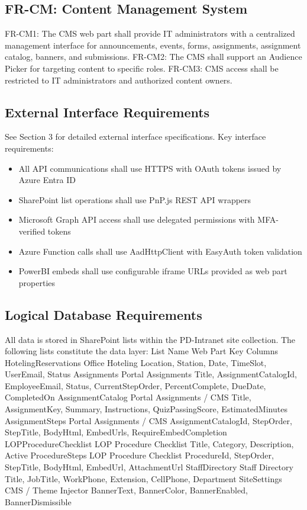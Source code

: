 \documentclass[12pt]{article}
\begin{document}
\subsection*{FR-CM: Content Management System}

FR-CM1: The CMS web part shall provide IT administrators with a centralized management interface for announcements, events, forms, assignments, assignment catalog, banners, and submissions. FR-CM2: The CMS shall support an Audience Picker for targeting content to specific roles. FR-CM3: CMS access shall be restricted to IT administrators and authorized content owners.

\subsection{External Interface Requirements}

See Section 3 for detailed external interface specifications. Key interface requirements:

\begin{itemize}[leftmargin=*]
\item  All API communications shall use HTTPS with OAuth tokens issued by Azure Entra ID
\item  SharePoint list operations shall use PnP.js REST API wrappers
\item  Microsoft Graph API access shall use delegated permissions with MFA-verified tokens
\end{itemize}

\begin{itemize}[leftmargin=*]
\item  Azure Function calls shall use AadHttpClient with EasyAuth token validation
\item  PowerBI embeds shall use configurable iframe URLs provided as web part properties
\end{itemize}

\subsection{Logical Database Requirements}

All data is stored in SharePoint lists within the PD-Intranet site collection. The following lists constitute the data layer: List Name Web Part Key Columns HotelingReservations Office Hoteling Location, Station, Date, TimeSlot, UserEmail, Status Assignments Portal Assignments Title, AssignmentCatalogId, EmployeeEmail, Status, CurrentStepOrder, PercentComplete, DueDate, CompletedOn AssignmentCatalog Portal Assignments / CMS Title, AssignmentKey, Summary, Instructions, QuizPassingScore, EstimatedMinutes AssignmentSteps Portal Assignments / CMS AssignmentCatalogId, StepOrder, StepTitle, BodyHtml, EmbedUrls, RequireEmbedCompletion LOPProcedureChecklist LOP Procedure Checklist Title, Category, Description, Active ProcedureSteps LOP Procedure Checklist ProcedureId, StepOrder, StepTitle, BodyHtml, EmbedUrl, AttachmentUrl StaffDirectory Staff Directory Title, JobTitle, WorkPhone, Extension, CellPhone, Department SiteSettings CMS / Theme Injector BannerText, BannerColor, BannerEnabled, BannerDismissible
\end{document}
